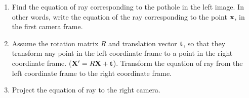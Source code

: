 \documentclass[times,singlecolumn]{article}
\begin{document}
\begin{enumerate}
\item Find the equation of ray corresponding to the pothole in the left image.
  In other words, write the equation of the ray corresponding to the point
  $\mathbf{x}$, in the first camera frame.
  \vspace{10em}

\item Assume the rotation matrix $R$ and translation vector $\mathbf{t}$, so
  that they transform any point in the left coordinate frame to a point in the
  right coordinate frame. ($\mathbf{X}' = R \mathbf{X}+ \mathbf{t}$). Transform the equation of
  ray from the left coordinate frame to the right coordinate frame.
  \vspace{10em}

\item Project the equation of ray to the right camera.
  \vspace{10em}

\end{enumerate}
\end{document}
